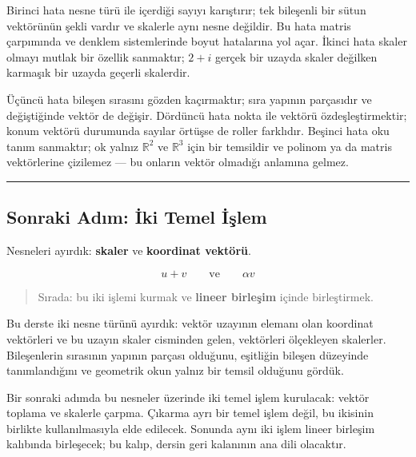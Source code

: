\documentclass[
  a4paper,
  DIV=11,
  numbers=noendperiod]{scrartcl}
\begin{document}
Birinci hata nesne türü ile içerdiği sayıyı karıştırır; tek bileşenli
bir sütun vektörünün şekli vardır ve skalerle aynı nesne değildir. Bu
hata matris çarpımında ve denklem sistemlerinde boyut hatalarına yol
açar. İkinci hata skaler olmayı mutlak bir özellik sanmaktır; \(2+i\)
gerçek bir uzayda skaler değilken karmaşık bir uzayda geçerli skalerdir.

Üçüncü hata bileşen sırasını gözden kaçırmaktır; sıra yapının parçasıdır
ve değiştiğinde vektör de değişir. Dördüncü hata nokta ile vektörü
özdeşleştirmektir; konum vektörü durumunda sayılar örtüşse de roller
farklıdır. Beşinci hata oku tanım sanmaktır; ok yalnız \(\mathbb{R}^2\)
ve \(\mathbb{R}^3\) için bir temsildir ve polinom ya da matris
vektörlerine çizilemez --- bu onların vektör olmadığı anlamına gelmez.

\begin{center}\rule{0.5\linewidth}{0.5pt}\end{center}

\subsection{Sonraki Adım: İki Temel
İşlem}\label{sonraki-adux131m-iki-temel-iux15flem}

Nesneleri ayırdık: \textbf{skaler} ve \textbf{koordinat vektörü}.

\[
u+v
\qquad\text{ve}\qquad
\alpha v
\]

\begin{quote}
Sırada: bu iki işlemi kurmak ve \textbf{lineer birleşim} içinde
birleştirmek.
\end{quote}

Bu derste iki nesne türünü ayırdık: vektör uzayının elemanı olan
koordinat vektörleri ve bu uzayın skaler cisminden gelen, vektörleri
ölçekleyen skalerler. Bileşenlerin sırasının yapının parçası olduğunu,
eşitliğin bileşen düzeyinde tanımlandığını ve geometrik okun yalnız bir
temsil olduğunu gördük.

Bir sonraki adımda bu nesneler üzerinde iki temel işlem kurulacak:
vektör toplama ve skalerle çarpma. Çıkarma ayrı bir temel işlem değil,
bu ikisinin birlikte kullanılmasıyla elde edilecek. Sonunda aynı iki
işlem lineer birleşim kalıbında birleşecek; bu kalıp, dersin geri
kalanının ana dili olacaktır.
\end{document}
